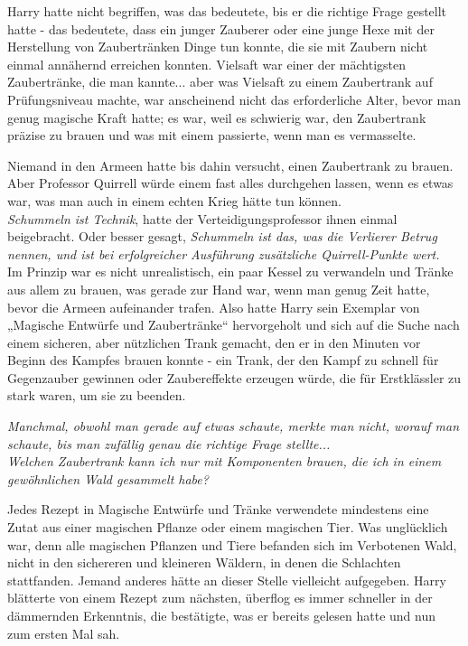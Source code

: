 {Harry hatte nicht begriffen, was das bedeutete, bis er die richtige Frage gestellt hatte - das bedeutete, dass ein junger Zauberer oder eine junge Hexe mit der Herstellung von Zaubertränken Dinge tun konnte, die sie mit Zaubern nicht einmal annähernd erreichen konnten. Vielsaft war einer der mächtigsten Zaubertränke, die man kannte... aber was Vielsaft zu einem Zaubertrank auf Prüfungsniveau machte, war anscheinend nicht das erforderliche Alter, bevor man genug magische Kraft hatte; es war, weil es schwierig war, den Zaubertrank präzise zu brauen und was mit einem passierte, wenn man es vermasselte.

Niemand in den Armeen hatte bis dahin versucht, einen Zaubertrank zu brauen. Aber Professor Quirrell würde einem fast alles durchgehen lassen, wenn es etwas war, was man auch in einem echten Krieg hätte tun können.\\ \emph{Schummeln ist Technik}, hatte der Verteidigungsprofessor ihnen einmal beigebracht. Oder besser gesagt, \emph{Schummeln ist das, was die Verlierer Betrug nennen, und ist bei erfolgreicher Ausführung zusätzliche Quirrell-Punkte wert.}\\ Im Prinzip war es nicht unrealistisch, ein paar Kessel zu verwandeln und Tränke aus allem zu brauen, was gerade zur Hand war, wenn man genug Zeit hatte, bevor die Armeen aufeinander trafen. Also hatte Harry sein Exemplar von „Magische Entwürfe und Zaubertränke“ hervorgeholt und sich auf die Suche nach einem sicheren, aber nützlichen Trank gemacht, den er in den Minuten vor Beginn des Kampfes brauen konnte - ein Trank, der den Kampf zu schnell für Gegenzauber gewinnen oder Zaubereffekte erzeugen würde, die für Erstklässler zu stark waren, um sie zu beenden.

\emph{Manchmal, obwohl man gerade auf etwas schaute, merkte man nicht, worauf man schaute, bis man zufällig genau die richtige Frage stellte...}\\ \emph{Welchen Zaubertrank kann ich nur mit Komponenten brauen, die ich in einem gewöhnlichen Wald gesammelt habe?}

Jedes Rezept in Magische Entwürfe und Tränke verwendete mindestens eine Zutat aus einer magischen Pflanze oder einem magischen Tier. Was unglücklich war, denn alle magischen Pflanzen und Tiere befanden sich im Verbotenen Wald, nicht in den sichereren und kleineren Wäldern, in denen die Schlachten stattfanden. Jemand anderes hätte an dieser Stelle vielleicht aufgegeben. Harry blätterte von einem Rezept zum nächsten, überflog es immer schneller in der dämmernden Erkenntnis, die bestätigte, was er bereits gelesen hatte und nun zum ersten Mal sah.

}
